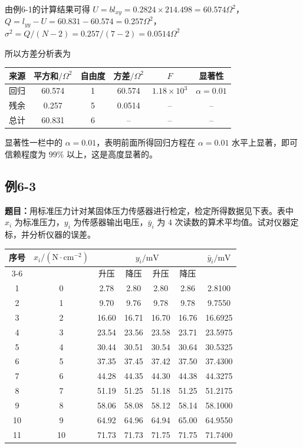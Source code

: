 \documentclass[UTF8,zihao=-4]{ctexart}
\newcommand{\problem}[1]{\subsection*{#1}}
\newcommand{\timu}{\noindent\textbf{题目：}}
\begin{document}
由例6-1的计算结果可得 $U=bl_{xy}=0.2824\times214.498=60.574\Omega^2$，$Q=l_{yy}-U=60.831-60.574=0.257\Omega^2$，$\sigma^2=Q/(N-2)=0.257/(7-2)=0.0514\Omega^2$

所以方差分析表为

\begin{center}
\small
\setlength{\tabcolsep}{5pt}
\begin{tabular}{c|c|c|c|c|c}
\toprule
来源 & 平方和$/\Omega^2$ & 自由度 & 方差$/\Omega^2$ & $F$ & 显著性\\
\midrule
回归 & 60.574 & 1 & 60.574 & $1.18\times10^3$ & $\alpha=0.01$\\
残余 & 0.257 & 5 & 0.0514 & -- & --\\
总计 & 60.831 & 6 & -- & -- & --\\
\bottomrule
\end{tabular}
\end{center}

显著性一栏中的 $\alpha=0.01$，表明前面所得回归方程在 $\alpha=0.01$ 水平上显著，即可信赖程度为 $99\%$ 以上，这是高度显著的。

\problem{例6-3}

\timu 用标准压力计对某固体压力传感器进行检定，检定所得数据见下表。表中 $x_i$ 为标准压力，$y_i$ 为传感器输出电压，$\bar{y}_i$ 为 $4$ 次读数的算术平均值。试对仪器定标，并分析仪器的误差。

\begin{center}
\scriptsize
\setlength{\tabcolsep}{4pt}
\begin{tabular}{c|c|cccc|c}
\toprule
序号 & $x_i/(\mathrm{N}\cdot\mathrm{cm}^{-2})$ & \multicolumn{4}{c|}{$y_i/\mathrm{mV}$} & $\bar{y}_i/\mathrm{mV}$\\
\cline{3-6}
 &  & 升压 & 降压 & 升压 & 降压 & \\
\midrule
1 & 0  & 2.78 & 2.80 & 2.80 & 2.86 & 2.8100\\
2 & 1  & 9.70 & 9.76 & 9.78 & 9.78 & 9.7550\\
3 & 2  & 16.60 & 16.71 & 16.70 & 16.76 & 16.6925\\
4 & 3  & 23.54 & 23.56 & 23.58 & 23.71 & 23.5975\\
5 & 4  & 30.44 & 30.51 & 30.54 & 30.64 & 30.5325\\
6 & 5  & 37.35 & 37.45 & 37.42 & 37.50 & 37.4300\\
7 & 6  & 44.28 & 44.35 & 44.30 & 44.38 & 44.3275\\
8 & 7  & 51.19 & 51.25 & 51.18 & 51.25 & 51.2175\\
9 & 8  & 58.06 & 58.08 & 58.12 & 58.14 & 58.1000\\
10 & 9 & 64.92 & 64.96 & 64.94 & 65.00 & 64.9550\\
11 & 10 & 71.73 & 71.73 & 71.75 & 71.75 & 71.7400\\
\bottomrule
\end{tabular}
\end{center}
\end{document}
